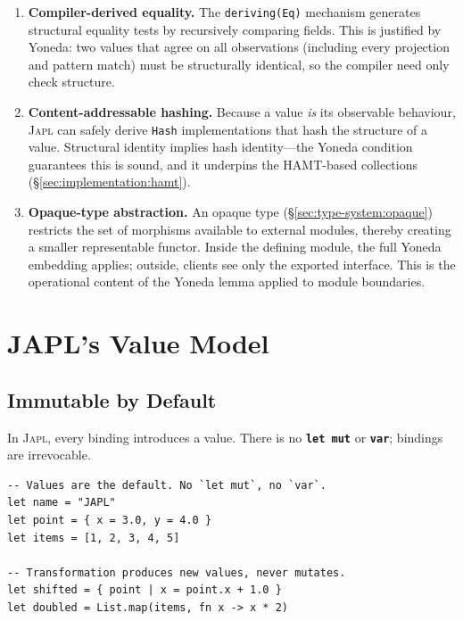 \documentclass[11pt]{article}
\theoremstyle{definition}
\theoremstyle{remark}
\newcommand{\japl}{\textsc{Japl}}
\newcommand{\keyword}[1]{\texttt{\textbf{#1}}}
\begin{document}
\begin{enumerate}
  \item \textbf{Compiler-derived equality.}  The \texttt{deriving(Eq)}
    mechanism generates structural equality tests by recursively
    comparing fields.  This is justified by Yoneda: two values that
    agree on all observations (including every projection and pattern
    match) must be structurally identical, so the compiler need only
    check structure.

  \item \textbf{Content-addressable hashing.}  Because a value \emph{is}
    its observable behaviour, \japl{} can safely derive \texttt{Hash}
    implementations that hash the structure of a value.  Structural
    identity implies hash identity---the Yoneda condition guarantees
    this is sound, and it underpins the HAMT-based collections
    (\S\ref{sec:implementation:hamt}).

  \item \textbf{Opaque-type abstraction.}  An opaque type
    (\S\ref{sec:type-system:opaque}) restricts the set of morphisms
    available to external modules, thereby creating a smaller
    representable functor.  Inside the defining module, the full
    Yoneda embedding applies; outside, clients see only the exported
    interface.  This is the operational content of the Yoneda lemma
    applied to module boundaries.
\end{enumerate}


\section{JAPL's Value Model}
\label{sec:japl-value-model}

\subsection{Immutable by Default}

In \japl{}, every binding introduces a value.  There is no
\keyword{let mut} or \keyword{var}; bindings are irrevocable.

\begin{lstlisting}[caption={Basic value bindings in \japl{}.}]
-- Values are the default. No `let mut`, no `var`.
let name = "JAPL"
let point = { x = 3.0, y = 4.0 }
let items = [1, 2, 3, 4, 5]

-- Transformation produces new values, never mutates.
let shifted = { point | x = point.x + 1.0 }
let doubled = List.map(items, fn x -> x * 2)
\end{lstlisting}
\end{document}
